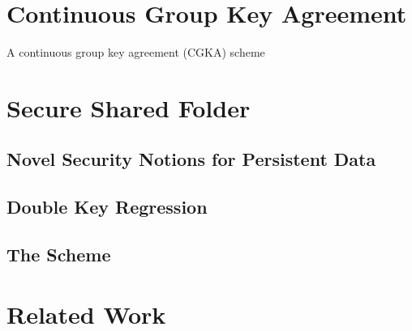 \section{Continuous Group Key Agreement}\label{sc:CGKA}

A continuous group key agreement (CGKA) scheme~\cite{C:ACDT20} 

\section{Secure Shared Folder}\label{sc:SSF}

\subsection{Novel Security Notions for Persistent Data}

\subsection{Double Key Regression}\label{ssc:DKR}

\subsection{The Scheme}

\section{Related Work}

